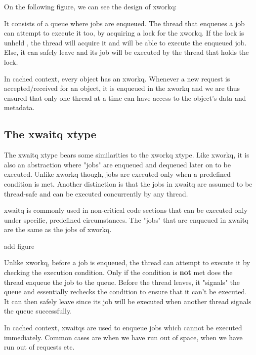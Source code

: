 On the following figure, we can see the design of xworkq:


It consists of a queue where jobs are enqueued.  The thread that enqueues a job 
can attempt to execute it too, by acquiring a lock for the xworkq. If the lock 
is unheld%
, the thread will acquire it and will be able to execute the enqueued job.  
Else, it can safely leave and its job will be executed by the thread that holds 
the lock.

In cached context, every object has an xworkq. Whenever a new request is 
accepted/received for an object, it is enqueued in the xworkq and we are thus 
ensured that only one thread at a time can have access to the object's data and 
metadata.

\subsection{The xwaitq xtype}\label{sec:xwaitq-design}

The xwaitq xtype bears some similarities to the xworkq xtype. Like xworkq, it 
is also an abstraction where "jobs" are enqueued and dequeued later on to be 
executed. Unlike xworkq though, jobs are executed only when a predefined 
condition is met. Another distinction is that the jobs in xwaitq are assumed to 
be thread-safe and can be executed concurrently by any thread.  


xwaitq is commonly used in non-critical code sections that can be executed only 
under specific, predefined circumstances. The "jobs" that are enqueued in 
xwaitq are the same as the jobs of xworkq.

\fixme add figure

Unlike xworkq, before a job is enqueued, the thread can attempt to execute it 
by checking the execution condition. Only if the condition is \textbf{not} met 
does the thread enqueue the job to the queue. Before the thread leaves, it 
"signals" the queue and essentially rechecks the condition to ensure that it 
can't be executed. It can then safely leave since its job will be executed when 
another thread signals the queue successfully.

In cached context, xwaitqs are used to enqueue jobs which cannot be executed 
immediately. Common cases are when we have run out of space, when we have run 
out of requests etc.

